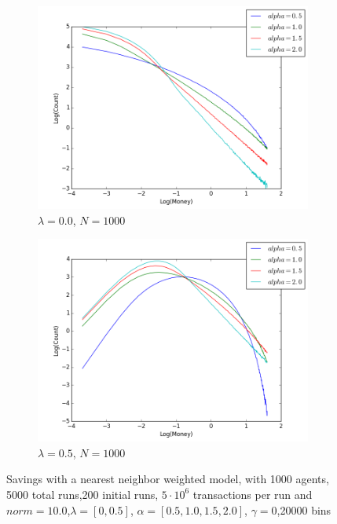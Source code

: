 \documentclass[a4paper,11pt]{article}
\begin{document}
{\begin{figure}[H]
	\centering
	\begin{subfigure}[t]{0.45\textwidth}
		\includegraphics[scale=0.4]{nearestneighbor_lambda=0_0_agens=1000}
		\caption{$\lambda = 0.0$, $N=1000$}
		\label{fig:0.0_1000}
	\end{subfigure}
	\begin{subfigure}[t]{0.45\textwidth}
		\includegraphics[scale=0.4]{nearestneighbor_lambda=0_5_agens=1000}
		\caption{$\lambda = 0.5$, $N=1000$}
		\label{fig:0.5_1000}
	\end{subfigure}
	\caption{Savings with a nearest neighbor weighted  model, with 1000 agents, 5000 total runs,200 initial runs,  $5\cdot 10^{6}$ transactions per run and  $norm=10.0$,$\lambda=[0,0.5]$, $\alpha=[0.5,1.0,1.5,2.0]$, $\gamma=0$,20000 bins}
	\label{fig:alpha_n1000}
\end{figure}


}
\end{document}
